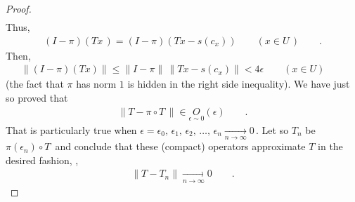\begin{proof}
\begin{align}
\end{align}
% 
Thus,
% 
\begin{align}
(I-\pi) (Tx\,)= (I-\pi ) (Tx - s(c_x)) \qquad (x\in U\,)\qquad .
\end{align}
% 
Then,
% 
\begin{align}
\|( I- \pi )(T x) \| \leq \| I- \pi \| \, \| Tx -s(c_x)\| < 4 \epsilon  \qquad (x\in U)\qquad 
\end{align}
% 
(the fact that $\pi$ has norm $1$ is hidden in the right side inequality). We have just so proved that 
% 
\begin{align}
\| T-\pi\circ T\, \| \in \underset{\epsilon \sim 0}{O}(\epsilon) \qquad . 
\end{align}
% 
That is particularly true when
$\epsilon=\epsilon_0,\, \epsilon_1,\, \epsilon_2,\, \dots ,\, \epsilon_n \underset{n\to \infty}{\longrightarrow} 0\,$. Let so
$T_n$ be $ \pi(\epsilon_n) \circ T\,$ and conclude that these (compact) operators approximate $T$ in the desired fashion, \ie,
% 
\begin{align}
\| T-T_n \| \underset{n \to \infty}{\longrightarrow} 0\qquad .
\end{align}
% 
\end{proof}

% 
